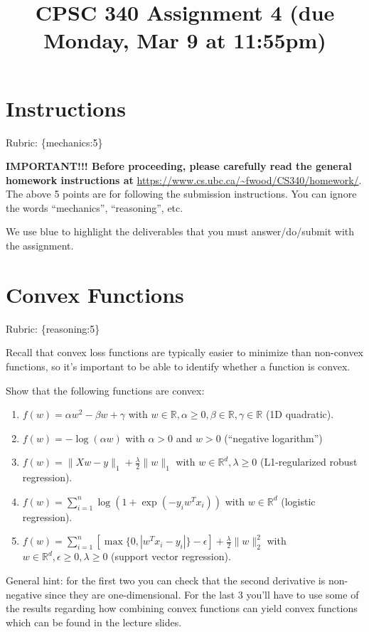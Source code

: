 \documentclass{article}
\def\rubric#1{\gre{Rubric: \{#1\}}}{}
\def\blu#1{{\color{blu}#1}}
\def\gre#1{{\color{gre}#1}}
\def\norm#1{\|#1\|}
\def\R{\mathbb{R}}
\def\enum#1{\begin{enumerate}#1\end{enumerate}}
\begin{document}
\title{CPSC 340 Assignment 4 (due Monday, Mar 9 at 11:55pm)}
\date{}
\maketitle

\vspace{-7em}


\section*{Instructions}
\rubric{mechanics:5}

\textbf{IMPORTANT!!! Before proceeding, please carefully read the general homework instructions at} \url{https://www.cs.ubc.ca/~fwood/CS340/homework/}. The above 5 points are for following the submission instructions. You can ignore the words ``mechanics'', ``reasoning'', etc.

\vspace{1em}
We use \blu{blue} to highlight the deliverables that you must answer/do/submit with the assignment.


\section{Convex Functions}
\rubric{reasoning:5}

Recall that convex loss functions are typically easier to minimize than non-convex functions, so it's important to be able to identify whether a function is convex.

\blu{Show that the following functions are convex}:

\enum{
\item $f(w) = \alpha w^2 - \beta w + \gamma$ with $w \in \R, \alpha \geq 0, \beta \in \R, \gamma \in \R$ (1D quadratic).
\item $f(w) = -\log(\alpha w) $ with $\alpha > 0$ and $w > 0$ (``negative logarithm'')
\item $f(w) = \norm{Xw-y}_1 + \frac{\lambda}{2}\norm{w}_1$ with $w \in \R^d, \lambda \geq 0$ (L1-regularized robust regression).
\item $f(w) = \sum_{i=1}^n \log(1+\exp(-y_iw^Tx_i)) $ with $w \in \R^d$ (logistic regression).
\item $f(w) = \sum_{i=1}^n[\max\{0,|w^Tx_i - y_i|\} - \epsilon] + \frac{\lambda}{2}\norm{w}_2^2$  with $w \in \R^d, \epsilon \geq 0, \lambda \geq 0$ (support vector regression).
}

General hint: for the first two you can check that the second derivative is non-negative since they are one-dimensional. For the last 3 you'll have to use some of the results regarding how combining convex functions can yield convex functions which can be found in the lecture slides.
\end{document}
